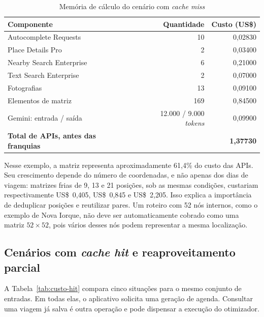 \begin{table}[H]
\centering
\small
\caption{Memória de cálculo do cenário com \textit{cache miss}}
\label{tab:custo-miss}
\begin{tabularx}{\textwidth}{>{\raggedright\arraybackslash}Xrr}
\hline
\textbf{Componente} & \textbf{Quantidade} & \textbf{Custo (US\$)} \\
\hline
Autocomplete Requests & 10 & 0,02830 \\
Place Details Pro & 2 & 0,03400 \\
Nearby Search Enterprise & 6 & 0,21000 \\
Text Search Enterprise & 2 & 0,07000 \\
Fotografias & 13 & 0,09100 \\
Elementos de matriz & 169 & 0,84500 \\
Gemini: entrada / saída & 12.000 / 9.000 \textit{tokens} & 0,09900 \\
\hline
\textbf{Total de APIs, antes das franquias} & & \textbf{1,37730} \\
\hline
\end{tabularx}
\end{table}

Nesse exemplo, a matriz representa aproximadamente 61,4\% do custo das APIs. Seu crescimento depende do número de coordenadas, e não apenas dos dias de viagem: matrizes frias de 9, 13 e 21 posições, sob as mesmas condições, custariam respectivamente US\$~0,405, US\$~0,845 e US\$~2,205. Isso explica a importância de deduplicar posições e reutilizar pares. Um roteiro com 52 nós internos, como o exemplo de Nova Iorque, não deve ser automaticamente cobrado como uma matriz $52\times52$, pois vários desses nós podem representar a mesma localização.

\subsection{Cenários com \textit{cache hit} e reaproveitamento parcial}

A Tabela~\ref{tab:custo-hit} compara cinco situações para o mesmo conjunto de entradas. Em todas elas, o aplicativo solicita uma geração de agenda. Consultar uma viagem já salva é outra operação e pode dispensar a execução do otimizador.

